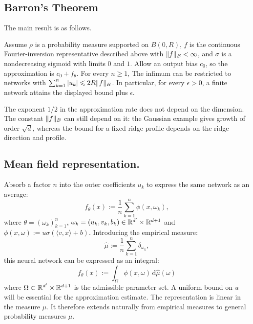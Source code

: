 \subsection{Barron's Theorem}


The main result is as follows.

\begin{thm}
Assume $\rho$ is a probability measure supported on $B(0,R)$, $f$ is the continuous Fourier-inversion representative described above with $\lVert f\rVert_B<\infty$, and $\sigma$ is a nondecreasing sigmoid with limits $0$ and $1$. Allow an output bias $c_0$, so the approximation is $c_0+f_\theta$. For every $n\geq1$,
The infimum can be restricted to networks with $\sum_{k=1}^n|u_k|\leqslant2R\lVert f\rVert_B$. In particular, for every $\epsilon>0$, a finite network attains the displayed bound plus $\epsilon$.
\end{thm}

The exponent $1/2$ in the approximation rate does not depend on the dimension. The constant $\lVert f\rVert_B$ can still depend on it: the Gaussian example gives growth of order $\sqrt d$, whereas the bound for a fixed ridge profile depends on the ridge direction and profile.




\subsection{Mean field representation.}

Absorb a factor $n$ into the outer coefficients $u_k$ to express the same network as an average:
\[
	f_\theta(x) := \frac{1}{n} \sum_{k=1}^n \phi(x, \omega_k),
\]
where $\theta = (\omega_k)_{k=1}^n$, $\omega_k = (u_k, v_k, b_k) \in \mathbb{R}^{d'} \times \mathbb{R}^{d+1}$ and $\phi(x,\omega) := u \sigma(\langle v, x \rangle + b)$. Introducing the empirical measure:
\[
	\hat{\mu} := \frac{1}{n} \sum_{k=1}^n \delta_{\omega_k},
\]
this neural network can be expressed as an integral:
\[
	f_\theta(x) := \int_\Omega \phi(x, \omega) \, \mathrm{d}\hat{\mu}(\omega)
\]
where $\Omega \subset \mathbb{R}^{d'} \times \mathbb{R}^{d+1}$ is the admissible parameter set. A uniform bound on $u$ will be essential for the approximation estimate.
%
The representation is linear in the measure $\mu$. It therefore extends naturally from empirical measures to general probability measures $\mu$.

